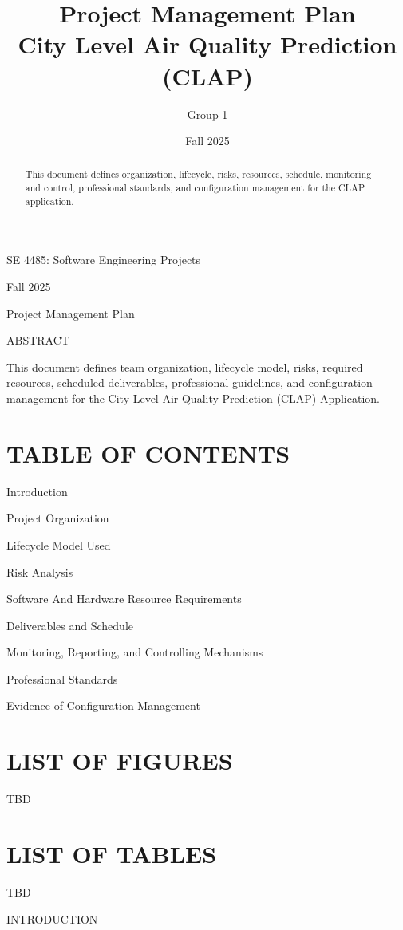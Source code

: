 \documentclass[11pt]{article}
\title{Project Management Plan\\\large City Level Air Quality Prediction (CLAP)}
\author{Group 1}
\date{Fall 2025}
\begin{document}
\maketitle

\begin{abstract}
This document defines organization, lifecycle, risks, resources, schedule, monitoring and control, professional standards, and configuration management for the CLAP application.
\end{abstract}

\section{}
SE 4485: Software Engineering Projects

Fall 2025

Project Management Plan

ABSTRACT

This document defines team organization, lifecycle model, risks, required resources, scheduled deliverables, professional guidelines, and configuration management for the City Level Air Quality Prediction (CLAP) Application.

\section{TABLE OF CONTENTS}
Introduction

Project Organization

Lifecycle Model Used

Risk Analysis

Software And Hardware Resource Requirements

Deliverables and Schedule

Monitoring, Reporting, and Controlling Mechanisms

Professional Standards

Evidence of Configuration Management

\section{LIST OF FIGURES}
TBD

\section{LIST OF TABLES}
TBD

INTRODUCTION
\end{document}
